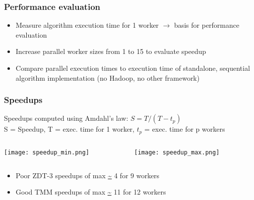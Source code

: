 \begin{frame}
  \frametitle{Performance evaluation}
  \begin{itemize}
    \item Measure algorithm execution time for 1 worker $\rightarrow$ basis for performance evaluation
    \item Increase parallel worker sizes from 1 to 15 to evaluate speedup
    \item Compare parallel execution times to execution time of standalone, sequential algorithm implementation (no Hadoop, no other framework)
  \end{itemize}
\end{frame}
  
\begin{frame}
  \frametitle{Speedups}
  Speedups computed using Amdahl's law: $S = T / (T - t_p)$\\
  \vspace{.5em}
  \scriptsize
  S = Speedup, T = exec. time for 1 worker, $t_p$ = exec. time for p workers
  \begin{columns}
    \begin{column}{.5\textwidth}
      \begin{center}
	\texttt{[image: speedup\_min.png]}
      \end{center}
    \end{column}
    \begin{column}{.5\textwidth}
      \begin{center}
	\texttt{[image: speedup\_max.png]}
      \end{center}
    \end{column}
  \end{columns}
  \normalsize
  \begin{itemize}
    \item Poor ZDT-3 speedups of max \url{~} 4 for 9 workers
    \item Good TMM speedups of max \url{~} 11 for 12 workers
  \end{itemize}
\end{frame}

